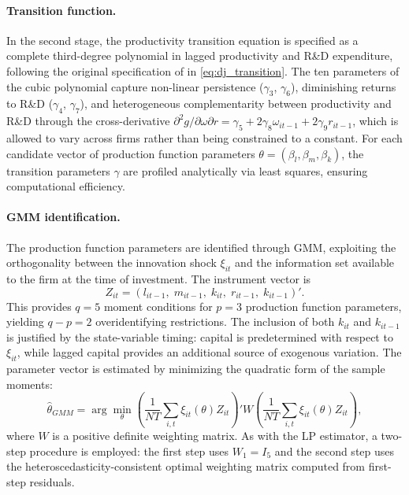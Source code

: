 \documentclass[a4paper, 12pt]{article}
\begin{document}
\paragraph{Transition function.}
In the second stage, the productivity transition equation is specified as a complete third-degree polynomial in lagged productivity and R\&D expenditure, following the original specification of \textcite{doraszelski2013r} in \eqref{eq:dj_transition}. The ten parameters of the cubic polynomial capture non-linear persistence ($\gamma_3$, $\gamma_6$), diminishing returns to R\&D ($\gamma_4$, $\gamma_7$), and heterogeneous complementarity between productivity and R\&D through the cross-derivative $\partial^2 g / \partial\omega\partial r = \gamma_5 + 2\gamma_8\omega_{it-1} + 2\gamma_9 r_{it-1}$, which is allowed to vary across firms rather than being constrained to a constant. For each candidate vector of production function parameters $\theta = (\beta_l, \beta_m, \beta_k)$, the transition parameters $\gamma$ are profiled analytically via least squares, ensuring computational efficiency.

\paragraph{GMM identification.}
The production function parameters are identified through GMM, exploiting the orthogonality between the innovation shock $\xi_{it}$ and the information set available to the firm at the time of investment. The instrument vector is
\begin{equation}
Z_{it} = (l_{it-1},\; m_{it-1},\; k_{it},\; r_{it-1},\; k_{it-1})'.
\end{equation}
This provides $q = 5$ moment conditions for $p = 3$ production function parameters, yielding $q - p = 2$ overidentifying restrictions. The inclusion of both $k_{it}$ and $k_{it-1}$ is justified by the state-variable timing: capital is predetermined with respect to $\xi_{it}$, while lagged capital provides an additional source of exogenous variation. The parameter vector is estimated by minimizing the quadratic form of the sample moments:
\begin{equation}
\hat{\theta}_{GMM} = \arg \min_{\theta} \left( \frac{1}{NT} \sum_{i,t} \xi_{it}(\theta) Z_{it} \right)' W \left( \frac{1}{NT} \sum_{i,t} \xi_{it}(\theta) Z_{it} \right),
\end{equation}
where $W$ is a positive definite weighting matrix. As with the LP estimator, a two-step procedure is employed: the first step uses $W_1 = I_5$ and the second step uses the heteroscedasticity-consistent optimal weighting matrix computed from first-step residuals.
\end{document}
